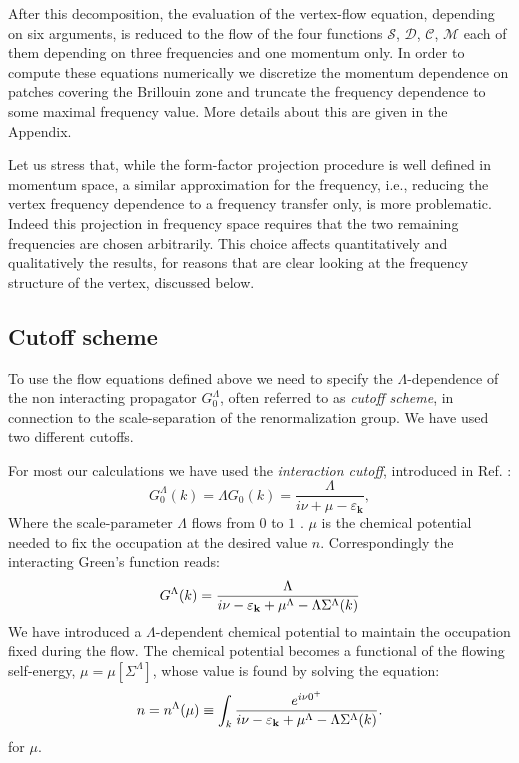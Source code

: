 After this decomposition, the evaluation of the vertex-flow equation, depending on six arguments, is reduced to the flow of the four functions $\mathcal{S}$, $\mathcal{D}$, $\mathcal{C}$, $\mathcal{M}$ 
each of them depending on three frequencies and one momentum only. In order to compute these equations numerically we discretize the momentum 
dependence on patches covering the Brillouin zone and truncate the frequency dependence to some maximal frequency value. More details about this are given in the Appendix. 

Let us stress that, while the form-factor projection procedure is well defined in momentum space, a similar approximation for the frequency, i.e., reducing the vertex frequency dependence to a frequency transfer only\cite{Karrasch2008a,Husemann2012,Taranto2014}, is more problematic.
Indeed this projection in frequency space requires that the two remaining frequencies are chosen arbitrarily. 
This choice affects quantitatively and qualitatively the results, for reasons that are clear looking at the frequency structure of the vertex, discussed below. 

\subsection{Cutoff scheme}
To use the flow equations defined above we need to specify the $\Lambda$-dependence of the non interacting propagator $G_0^\Lambda$, often referred to as \textit{cutoff scheme}, in connection to the scale-separation of the renormalization group. 
We have used two different cutoffs. 

For most our calculations we have used the \textit{interaction cutoff}, introduced in Ref. : 
 \begin{equation}
 G_0^\Lambda(k) = \Lambda G_0(k)=\frac{\Lambda}{i\nu+\mu-\varepsilon_{\mathbf{k}} } , 
 \end{equation}
  Where the scale-parameter $\Lambda$ flows from $0$ to $1$%
. $\mu$ is the chemical potential needed to fix the occupation at the desired value $n$. Correspondingly the interacting Green's function reads: 
\begin{equation}
G^\Lambda (k) = \frac{\Lambda}{i\nu - \varepsilon_{\mathbf{k}} +\mu^{\Lambda}-\Lambda\Sigma^\Lambda(k)} 
\end{equation} 
We have introduced a $\Lambda$-dependent chemical potential to maintain the occupation fixed during the flow. The chemical potential becomes a functional of the flowing self-energy, $\mu=\mu[\Sigma^\Lambda]$, whose value is found by solving the equation:  
\begin{equation}
n = n^{\Lambda}(\mu) \equiv \int_k \frac{e^{i\nu 0^{+}}} {i\nu - \varepsilon_{\mathbf{k}} +\mu^{\Lambda}-\Lambda\Sigma^\Lambda(k)}. 
\end{equation} 
for $\mu$.  

